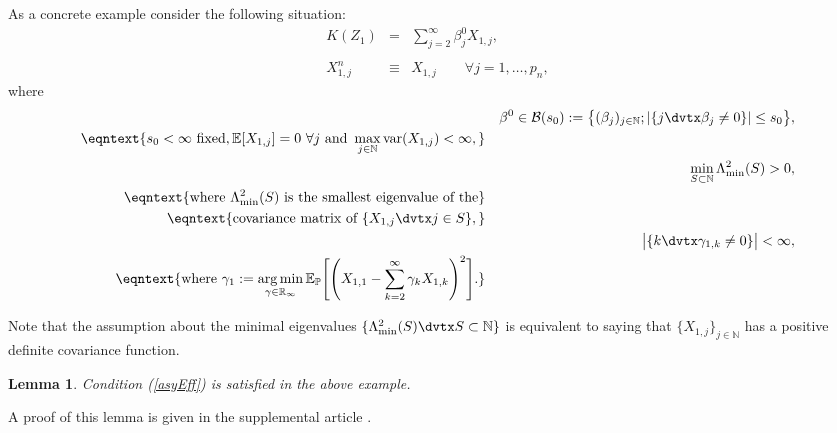 \documentclass[aos,MSNbibl,dvips]{arximspdf}
\def\cal{\mathcal}
\newcommand{\eqref}[1]{(\ref{#1})}
\newtheorem{lemm}{Lemma}[section]
\newcommand{\PP}{\mathbb{P}}
\newcommand{\EE}{\mathbb{E}}
\newcommand{\R}{\mathbb{R}}
\newcommand{\Nat}{\mathbb{N}}
\newcommand{\eps}{\varepsilon}
\newcommand{\argmin}{\mathop{\arg\min}}
\begin{document}
As a concrete example consider the following situation:
%
\begin{eqnarray}
\label{modsemip}   K(Z_1)& =& \sum_{j=2}^{\infty}
\beta^0_j X_{1,j}, %
\nonumber
\\[-8pt]
\\[-8pt]
\nonumber
 X_{1,j}^n&\equiv& X_{1,j} \qquad\forall j=1,
\ldots,p_n,
\end{eqnarray}
%
\mbox{where}
\begin{eqnarray}
&&\beta^0 \in{\cal B}
(s_0):= \bigl\{(\beta _j)_{j \in\Nat}; | \{ j \dvtx
\beta_j \neq0 \} | \le s_0\bigr\},\nonumber\\
\eqntext{ s_0 <\infty\mbox{ fixed},
\EE[X_{1,j} ] = 0\ \forall j \mbox{ and }\displaystyle \max_{j \in
\Nat
} \operatorname{var} ( X_{1,j} ) <
\infty,}
\\
&&\min_{S \subset\Nat} \Lambda_{\mathrm{min}}^2(S)>0,
\nonumber\\
\eqntext{ \mbox{where } \Lambda_{\mathrm{min}}^2(S) \mbox{ is
the smallest eigenvalue of the}}\\
\eqntext{\mbox{covariance matrix of } \{X_{1, j}\dvtx j \in S\},}
\\
& & \bigl| \{ k\dvtx \gamma_{1,k}\neq0 \}
\bigr| < \infty,
\nonumber\\
\eqntext{\mbox{where }\displaystyle \gamma_1:= \argmin_{\gamma\in\R_{\infty} }
\EE _{\PP
}\Biggl[\Biggl(X_{1,1} - \sum
_{k =2}^{\infty} \gamma_k X_{1, k}
\Biggr)^2\Biggr].}
\end{eqnarray}
%

Note that the assumption about the minimal eigenvalues $\{ \Lambda
_{\mathrm{min}}^2 (S)\dvtx S \subset\Nat\}$
is equivalent to saying that $\{ X_{1,j}\} _{j \in\Nat}$ has a positive
definite covariance function.

\begin{lemm}\label{concretelem}
Condition \eqref{asyEff} is satisfied in the above example.
\end{lemm}
%
A proof of this lemma is given in the supplemental article \cite{supplement}.
\end{document}
